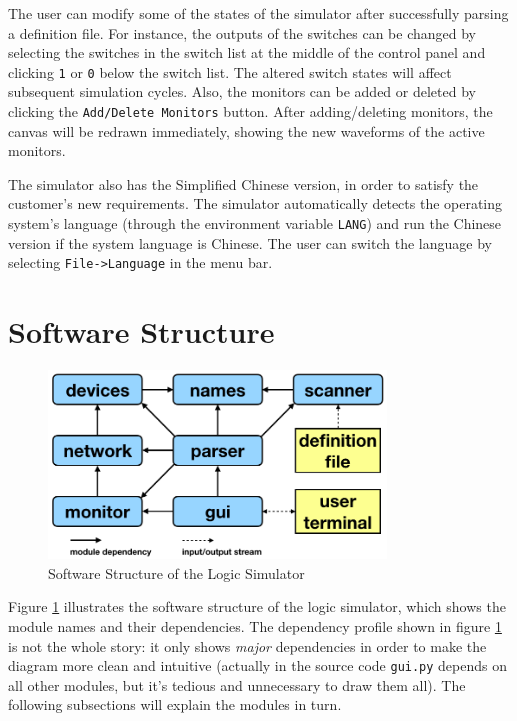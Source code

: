 \documentclass[10pt,a4paper]{article}
\begin{document}
The user can modify some of the states of the simulator after
successfully parsing a definition file. For instance, the outputs of
the switches can be changed by selecting the switches in the switch
list at the middle of the control panel and clicking \texttt{1} or \texttt{0} below
the switch list. The altered switch states will affect subsequent
simulation cycles. Also, the monitors can be added or deleted by
clicking the \texttt{Add/Delete Monitors} button. After adding/deleting
monitors, the canvas will be redrawn immediately, showing the new
waveforms of the active monitors.

The simulator also has the Simplified Chinese version, in order to
satisfy the customer's new requirements. The simulator automatically
detects the operating system's language (through the environment
variable \texttt{LANG}) and run the Chinese version if the system language is
Chinese. The user can switch the language by selecting
\texttt{File->Language} in the menu bar. 

\section{Software Structure}
\label{sec:org929ecc2}

\begin{figure}[htbp]
\centering
\includegraphics[width=0.8\textwidth]{./figures/dependency.png}
\caption{\label{fig:orgaec3f5b}
Software Structure of the Logic Simulator}
\end{figure}

Figure \ref{fig:orgaec3f5b} illustrates the software structure of the logic
simulator, which shows the module names and their dependencies. The
dependency profile shown in figure \ref{fig:orgaec3f5b} is not the whole
story: it only shows \emph{major} dependencies in order to make the diagram
more clean and intuitive (actually in the source code \texttt{gui.py} depends
on all other modules, but it's tedious and unnecessary to draw them
all). The following subsections will explain the modules in turn.
\end{document}
